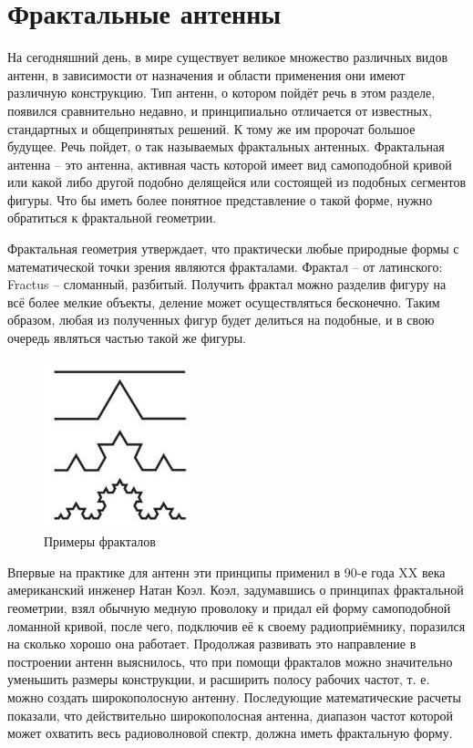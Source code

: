 \section{Фрактальные антенны}

На сегодняшний день, в мире существует великое множество различных видов антенн, в зависимости от назначения и области применения они имеют различную конструкцию. Тип антенн, о котором пойдёт речь в этом разделе, появился сравнительно недавно, и принципиально отличается от известных, стандартных и общепринятых решений. К тому же им пророчат большое будущее. Речь пойдет, о так называемых фрактальных антенных. Фрактальная антенна – это антенна, активная часть которой имеет вид самоподобной кривой или какой либо другой подобно делящейся или состоящей из подобных сегментов фигуры. Что бы иметь более понятное представление о такой форме, нужно обратиться к фрактальной геометрии.

Фрактальная геометрия утверждает, что практически любые природные формы с математической точки зрения являются фракталами. Фрактал – от латинского: Fractus – сломанный, разбитый. Получить фрактал можно разделив фигуру на всё более мелкие объекты, деление может осуществляться бесконечно. Таким образом, любая из полученных фигур будет делиться на подобные, и в свою очередь являться частью такой же фигуры.

\begin{figure}[H]
    \centering
    \includegraphics{img/fractals.jpeg}
    \caption{Примеры фракталов}
    \label{fig:fractals}
\end{figure}


Впервые на практике для антенн эти принципы применил в 90-е года XX века американский инженер Натан Коэл. Коэл, задумавшись о принципах фрактальной геометрии, взял обычную медную проволоку и придал ей форму самоподобной ломанной кривой, после чего, подключив её к своему радиоприёмнику, поразился на сколько хорошо она работает. Продолжая развивать это направление в построении антенн выяснилось, что при помощи фракталов можно значительно уменьшить размеры конструкции, и расширить полосу рабочих частот, т. е. можно создать широкополосную антенну. Последующие  математические расчеты показали, что действительно широкополосная антенна, диапазон частот которой может охватить весь радиоволновой спектр, должна иметь фрактальную форму.

